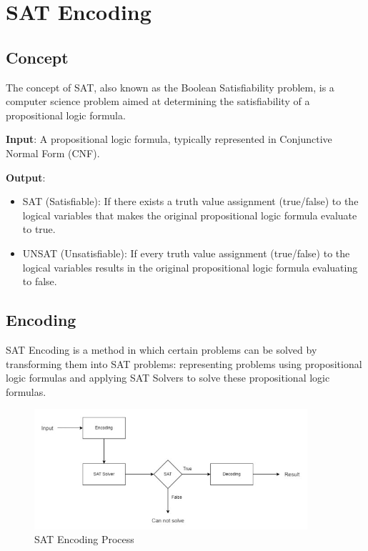 \section{SAT Encoding}
\subsection{Concept}
The concept of SAT, also known as the Boolean Satisfiability problem,
is a computer science problem aimed at determining the satisfiability of a propositional logic formula.

\begin{flushleft}
    \textbf{Input}: A propositional logic formula, typically represented in Conjunctive Normal Form (CNF).
\end{flushleft}

\begin{flushleft}
    \textbf{Output}:
\end{flushleft}
\begin{itemize}
    \item SAT (Satisfiable): If there exists a truth value assignment (true/false) to the
          logical variables that makes the original propositional logic formula evaluate to true.
    \item UNSAT (Unsatisfiable): If every truth value assignment (true/false) to the
          logical variables results in the original propositional logic formula evaluating to false.
\end{itemize}

\subsection{Encoding}
SAT Encoding is a method in which certain problems can be solved by transforming
them into SAT problems: representing problems using propositional logic formulas and
applying SAT Solvers to solve these propositional logic formulas.

\begin{figure}
    \centering
    \includegraphics[width=0.9\textwidth]{chapter1/image/flow_sat.jpg}
    \caption{SAT Encoding Process}
    \label{fig:sat_encoding_process}
\end{figure}

